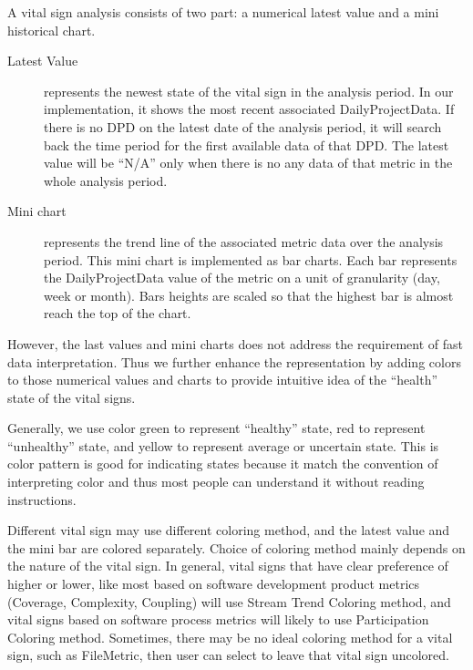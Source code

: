 A vital sign analysis consists of two part: a numerical latest value and a mini historical chart. 
\begin{description}
\item[Latest Value] represents the newest state of the vital sign in the analysis period. In our implementation, it shows the most recent associated DailyProjectData. If there is no DPD on the latest date of the analysis period, it will search back the time period for the first available data of that DPD. The latest value will be ``N/A'' only when there is no any data of that metric in the whole analysis period.
\item[Mini chart] represents the trend line of the associated metric data over the analysis period. This mini chart is implemented as bar charts. Each bar represents the DailyProjectData value of the metric on a unit of granularity (day, week or month). Bars heights are scaled so that the highest bar is almost reach the top of the chart.
\end{description}

However, the last values and mini charts does not address the requirement of fast data interpretation. Thus we further enhance the representation by adding colors to those numerical values and charts to provide intuitive idea of the ``health'' state of the vital signs.

Generally, we use color green to represent ``healthy'' state, red to represent ``unhealthy'' state, and yellow to represent average or uncertain state. This is color pattern is good for indicating states because it match the convention of interpreting color and thus most people can understand it without reading instructions.

Different vital sign may use different coloring method, and the latest value and the mini bar are colored separately. Choice of coloring method mainly depends on the nature of the vital sign. In general, vital signs that have clear preference of higher or lower, like most based on software development product metrics (Coverage, Complexity, Coupling) will use Stream Trend Coloring method, and vital signs based on software process metrics will likely to use Participation Coloring method. Sometimes, there may be no ideal coloring method for a vital sign, such as FileMetric, then user can select to leave that vital sign uncolored.

